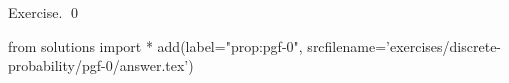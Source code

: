 
\begin{prop}
  \label{prop:pgf-0}
  
\end{prop}
\proof
Exercise.
\qed
\begin{python0}
from solutions import *
add(label="prop:pgf-0",
    srcfilename='exercises/discrete-probability/pgf-0/answer.tex') 
\end{python0}
